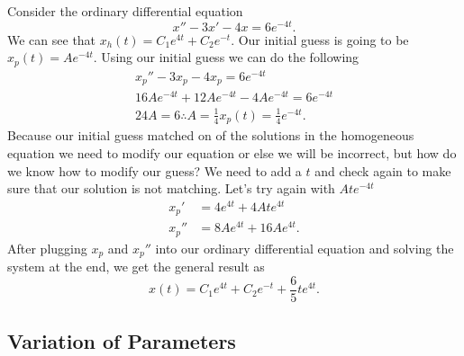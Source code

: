 \begin{problem}
  Consider the ordinary differential equation
  \[
  x''-3x'-4x=6e^{-4t}
  .\] 
  We can see that $x_h(t)=C_1e^{4t}+C_2e^{-t} $. Our initial guess is going to be $x_p(t)=Ae^{-4t}$. Using our initial guess we can do the following 
  \begin{align*}
    x_p''-3x_p-4x_p=6e^{-4t}\\
    16Ae^{-4t}+12Ae^{-4t}-4Ae^{-4t}=6e^{-4t}\\
    24A=6\therefore A=\frac{1}{4}
    x_p(t)=\frac{1}{4}e^{-4t}
  .\end{align*}
  Because our initial guess matched on of the solutions in the homogeneous equation we need to modify our equation or else we will be incorrect, but how do we know how to modify our guess? We need to add a $t$ and check again to make sure that our solution is not matching. Let's try again with $Ate^{-4t}$
  \begin{align*}
    x_p'&=4e^{4t}+4Ate^{4t}\\
    x_p''&=8Ae^{4t}+16Ae^{4t}
  .\end{align*}
  After plugging $x_p$ and $x_p''$ into our ordinary differential equation and solving the system at the end, we get the general result as
  \[
    x(t)=C_1e^{4t}+C_2e^{-t}+\frac{6}{5}te^{4t}
  .\] 
\end{problem}

\subsection{Variation of Parameters}

